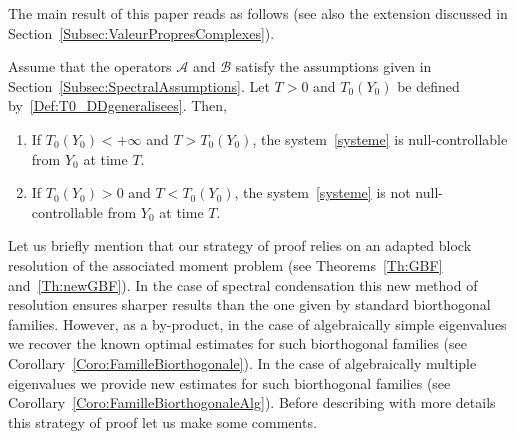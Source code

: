 \documentclass[AHL,Unicode,longabstracts]{cedram}
\newcommand\A{\mathcal{A}}
\newcommand\B{\mathcal{B}}
\newcommand{\Fzp}{Y_0}
\newcommand*{\romanenumi}{\renewcommand*{\theenumi}{\roman{enumi}}}
\begin{document}
The main result of this paper reads as follows (see also the extension discussed in Section~\ref{Subsec:ValeurPropresComplexes}).
\begin{theo} \label{Thm:Main}
Assume that the operators $\A$ and $\B$ satisfy the assumptions given in Section~\ref{Subsec:SpectralAssumptions}. Let $T>0$ and $T_0(\Fzp)$ be defined by~\eqref{Def:T0_DDgeneralisees}. Then,
\begin{enumerate}\romanenumi
\item \label{Thm:Main_pt1}
If $T_0(\Fzp) <+\infty$ and $T>T_0(\Fzp)$, the system~\eqref{systeme} is null-controllable from $\Fzp$ at time $T$.
\item \label{Thm:Main_pt2}
If $T_0(\Fzp) >0$ and $T<T_0(\Fzp)$, the system~\eqref{systeme} is not null-controllable from $\Fzp$ at time $T$.
\end{enumerate}
\end{theo}
Let us briefly mention that our strategy of proof relies on an adapted block resolution of the associated moment problem (see Theorems~\ref{Th:GBF} and~\ref{Th:newGBF}). In the case of spectral condensation this new method of resolution ensures sharper results than the one given by standard biorthogonal families. However, as a by-product, in the case of algebraically simple eigenvalues we recover the known optimal estimates for such biorthogonal families (see Corollary~\ref{Coro:FamilleBiorthogonale}). In the case of algebraically multiple eigenvalues we provide new estimates for such biorthogonal families (see Corollary~\ref{Coro:FamilleBiorthogonaleAlg}). Before describing with more details this strategy of proof let us make some comments.
\end{document}
